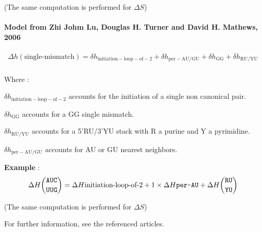 \documentclass{article}
\begin{document}
       (The same computation is performed for $\Delta S$)
       

\paragraph{\textbf{Model from Zhi Johm Lu, Douglas H. Turner and David H. Mathews, 2006}}

\begin{multline*}
\Delta h {(\mbox{single-mismatch})} =
\delta{}h_\mathrm{initiation-loop-of-2} +
\delta{}h_\mathrm{per-AU/GU} +
\delta{}h_\mathrm{GG} +
\delta{}h_\mathrm{RU/YU}\\
\end{multline*}

Where :

$\delta{}h_\mathrm{initiation-loop-of-2}$ accounts for the initiation of a single non canonical pair.

$\delta{}h_\mathrm{GG}$ accounts for a GG single mismatch.

$\delta{}h_\mathrm{RU/YU}$ accounts for a 5'RU/3'YU stack with R a purine and Y a pyrimidine.

$\delta{}h_\mathrm{per-AU/GU}$ accounts for AU or GU nearest neighbors.

\textbf{Example} :
\begin{multline*}
\Delta H {\mbox{\texttt{AUC}} \choose \mbox{\texttt{UUG}}} =
\Delta H {\mbox{initiation-loop-of-2}} + 
1 \times \Delta H {\mbox{\texttt{per-AU}} } +
\Delta H {\mbox{\texttt{RU}} \choose \mbox{\texttt{YU}} } \\
\end{multline*}

       (The same computation is performed for $\Delta S$)
       
For further information, see the referenced articles.
\end{document}
